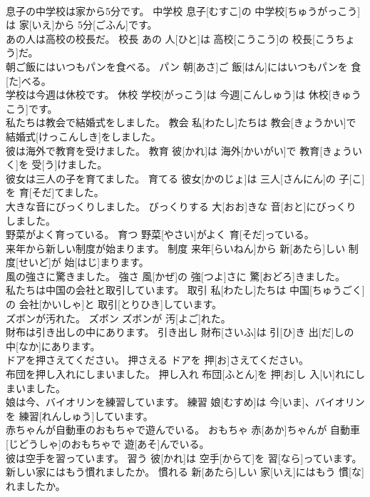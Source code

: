 \documentclass[8pt]{extreport}
\begin{document}
\begin{CJK}{UTF8}{min}
\\	息子の中学校は家から5分です。	中学校	息子[むすこ]の 中学校[ちゅうがっこう]は 家[いえ]から 5分[ごふん]です。	
\\	あの人は高校の校長だ。	校長	あの 人[ひと]は 高校[こうこう]の 校長[こうちょう]だ。	
\\	朝ご飯にはいつもパンを食べる。	パン	朝[あさ]ご 飯[はん]にはいつもパンを 食[た]べる。	
\\	学校は今週は休校です。	休校	学校[がっこう]は 今週[こんしゅう]は 休校[きゅうこう]です。	
\\	私たちは教会で結婚式をしました。	教会	私[わたし]たちは 教会[きょうかい]で 結婚式[けっこんしき]をしました。	
\\	彼は海外で教育を受けました。	教育	彼[かれ]は 海外[かいがい]で 教育[きょういく]を 受[う]けました。	
\\	彼女は三人の子を育てました。	育てる	彼女[かのじょ]は 三人[さんにん]の 子[こ]を 育[そだ]てました。	
\\	大きな音にびっくりしました。	びっくりする	大[おお]きな 音[おと]にびっくりしました。	
\\	野菜がよく育っている。	育つ	野菜[やさい]がよく 育[そだ]っている。	
\\	来年から新しい制度が始まります。	制度	来年[らいねん]から 新[あたら]しい 制度[せいど]が 始[はじ]まります。	
\\	風の強さに驚きました。	強さ	風[かぜ]の 強[つよ]さに 驚[おどろ]きました。	
\\	私たちは中国の会社と取引しています。	取引	私[わたし]たちは 中国[ちゅうごく]の 会社[かいしゃ]と 取引[とりひき]しています。	
\\	ズボンが汚れた。	ズボン	ズボンが 汚[よご]れた。	
\\	財布は引き出しの中にあります。	引き出し	財布[さいふ]は 引[ひ]き 出[だ]しの 中[なか]にあります。	
\\	ドアを押さえてください。	押さえる	ドアを 押[お]さえてください。	
\\	布団を押し入れにしまいました。	押し入れ	布団[ふとん]を 押[お]し 入[い]れにしまいました。	
\\	娘は今、バイオリンを練習しています。	練習	娘[むすめ]は 今[いま]、バイオリンを 練習[れんしゅう]しています。	
\\	赤ちゃんが自動車のおもちゃで遊んでいる。	おもちゃ	赤[あか]ちゃんが 自動車[じどうしゃ]のおもちゃで 遊[あそ]んでいる。	
\\	彼は空手を習っています。	習う	彼[かれ]は 空手[からて]を 習[なら]っています。	
\\	新しい家にはもう慣れましたか。	慣れる	新[あたら]しい 家[いえ]にはもう 慣[な]れましたか。	

\end{CJK}
\end{document}

